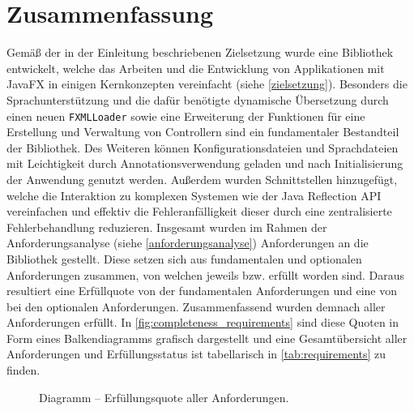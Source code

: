 \section{Zusammenfassung}
\label{zusammenfassung}
Gemäß der in der Einleitung beschriebenen Zielsetzung wurde eine Bibliothek entwickelt, welche das Arbeiten und die Entwicklung von Applikationen mit JavaFX in einigen Kernkonzepten vereinfacht (siehe \autoref{zielsetzung}). Besonders die Sprachunterstützung und die dafür benötigte dynamische Übersetzung durch einen neuen \texttt{FXMLLoader} sowie eine Erweiterung der Funktionen für eine Erstellung und Verwaltung von Controllern sind ein fundamentaler Bestandteil der Bibliothek. Des Weiteren können Konfigurationsdateien und Sprachdateien mit Leichtigkeit durch Annotationsverwendung geladen und nach Initialisierung der Anwendung genutzt werden. Außerdem wurden Schnittstellen hinzugefügt, welche die Interaktion zu komplexen Systemen wie der Java Reflection API vereinfachen und effektiv die Fehleranfälligkeit dieser durch eine zentralisierte Fehlerbehandlung reduzieren. Insgesamt wurden im Rahmen der Anforderungsanalyse (siehe \autoref{anforderungsanalyse}) \thereq{} Anforderungen an die Bibliothek gestellt. Diese setzen sich aus \thereqFunAmount{} fundamentalen und \thereqOptAmount{} optionalen Anforderungen zusammen, von welchen jeweils \thereqFunCompleted{} bzw. \thereqOptCompleted{} erfüllt worden sind. Daraus resultiert eine Erfüllquote von \CalculatePercentage{\thereqFunCompleted}{\thereqFunAmount} der fundamentalen Anforderungen und eine von \CalculatePercentage{\thereqOptCompleted}{\thereqOptAmount} bei den optionalen Anforderungen. Zusammenfassend wurden demnach \CalculatePercentage{\thereqTotalCompleted}{\thereq} aller Anforderungen erfüllt. In \autoref{fig:completeness_requirements} sind diese Quoten in Form eines Balkendiagramms grafisch dargestellt und eine Gesamtübersicht aller Anforderungen und Erfüllungsstatus ist tabellarisch in \autoref{tab:requirements} zu finden.
\begin{figure}[H]
	\centering
	\caption{Diagramm -- Erfüllungsquote aller Anforderungen.}
	\label{fig:completeness_requirements}
\end{figure}

